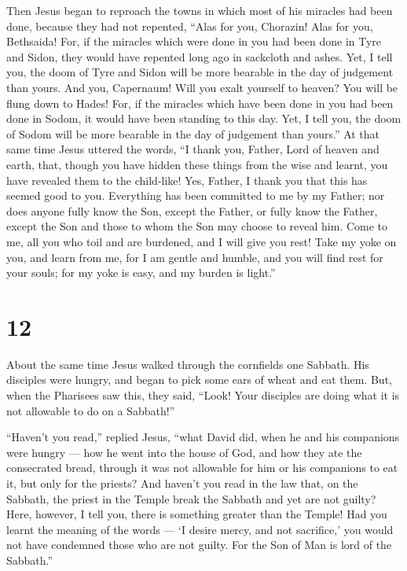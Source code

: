  Then Jesus began to reproach the towns in which most of
his miracles had been done, because they had not repented, 
``Alas for you, Chorazin! Alas for you, Bethsaida! For, if the miracles
which were done in you had been done in Tyre and Sidon, they would have
repented long ago in sackcloth and ashes.  Yet, I tell you,
the doom of Tyre and Sidon will be more bearable in the day of judgement
than yours.  And you, Capernaum! Will you exalt yourself to
heaven? You will be flung down to Hades! For, if the miracles which have
been done in you had been done in Sodom, it would have been standing to
this day.  Yet, I tell you, the doom of Sodom will be more
bearable in the day of judgement than yours.''  At that
same time Jesus uttered the words, ``I thank you, Father, Lord of heaven
and earth, that, though you have hidden these things from the wise and
learnt, you have revealed them to the child-like!  Yes,
Father, I thank you that this has seemed good to you. 
Everything has been committed to me by my Father; nor does anyone fully
know the Son, except the Father, or fully know the Father, except the
Son and those to whom the Son may choose to reveal him. 
Come to me, all you who toil and are burdened, and I will give you rest!
 Take my yoke on you, and learn from me, for I am gentle
and humble, and you will find rest for your souls;  for my
yoke is easy, and my burden is light.''

\hypertarget{section-11}{%
\section{12}\label{section-11}}

 About the same time Jesus walked through the cornfields one
Sabbath. His disciples were hungry, and began to pick some ears of wheat
and eat them.  But, when the Pharisees saw this, they said,
``Look! Your disciples are doing what it is not allowable to do on a
Sabbath!''

 ``Haven't you read,'' replied Jesus, ``what David did, when
he and his companions were hungry ---  how he went into the
house of God, and how they ate the consecrated bread, through it was not
allowable for him or his companions to eat it, but only for the priests?
 And haven't you read in the law that, on the Sabbath, the
priest in the Temple break the Sabbath and yet are not guilty?
 Here, however, I tell you, there is something greater than
the Temple!  Had you learnt the meaning of the words --- `I
desire mercy, and not sacrifice,' you would not have condemned those who
are not guilty.  For the Son of Man is lord of the
Sabbath.''

